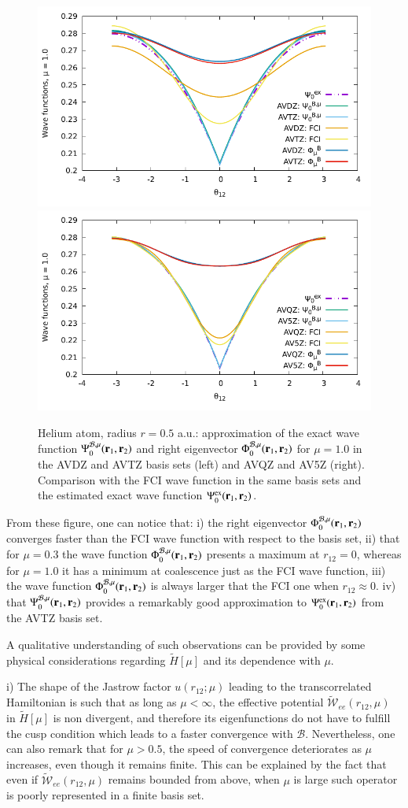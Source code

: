 \documentclass[aip,jcp,reprint,noshowkeys,superscriptaddress]{revtex4-1}
\newcommand{\br}[0]{{\bf {r}}}
\newcommand{\psiex}[0]{\Psi^{\text{ex}}_0}
\newcommand{\phimub}[0]{\Phi^{\mathcal{B},\mu}_0}
\newcommand{\psimub}[0]{\Psi^{\mathcal{B},\mu}_0}
\newcommand{\basis}[0]{\mathcal{B}}
\begin{document}
\begin{figure}
 \label{fig:mu_1.0_dz_3}
        \includegraphics[width=0.45\linewidth]{plots/He/cusp/He_mu_1_0_cusp_avdz_avtz_3.pdf}
        \includegraphics[width=0.45\linewidth]{plots/He/cusp/He_mu_1_0_cusp_avqz_av5z_3.pdf}\\
        \caption{
        Helium atom, radius $r=0.5$ a.u.: approximation of the exact wave function $\psimub(\br{}_1,\br{}_2)$ and right eigenvector $\phimub(\br{}_1,\br{}_2)$ for $\mu=1.0$ in the AVDZ and AVTZ basis sets (left) and AVQZ and AV5Z (right). Comparison with the FCI wave function in the same basis sets and the estimated exact wave function $\psiex(\br{}_1,\br{}_2)$.  }
\end{figure}


From these figure, one can notice that: 
i) the right eigenvector $\phimub(\br{}_1,\br{}_2)$ converges faster than the FCI wave function with respect to the basis set, 
ii) that for $\mu=0.3$ the wave function $\phimub(\br{}_1,\br{}_2)$ presents a maximum at $r_{12}=0$, whereas for $\mu=1.0$ it has a minimum at coalescence just as the FCI wave function, 
iii) the wave function $\phimub(\br{}_1,\br{}_2)$ is always larger that the FCI one when $r_{12}\approx 0$. 
iv) that $\psimub(\br{}_1,\br{}_2)$ provides a remarkably good approximation to $\psiex(\br{}_1,\br{}_2)$ from the AVTZ basis set.

A qualitative understanding of such observations can be provided by some physical considerations regarding $\tilde{H}[\mu]$ and its dependence with $\mu$. 

i) The shape of the Jastrow factor $u(r_{12};\mu)$ leading to the transcorrelated Hamiltonian is such that as long as $\mu < \infty$, the effective potential $\tilde{\mathcal{W}}_{ee}(r_{12},\mu)$ in $\tilde{H}[\mu]$ is non divergent, and therefore its eigenfunctions do not have to fulfill the cusp condition which leads to a faster convergence with $\basis$. 
Nevertheless, one can also remark that for $\mu > 0.5$, the speed of convergence deteriorates as $\mu$ increases, even though it remains finite. This can be explained by the fact that even if $\tilde{\mathcal{W}}_{ee}(r_{12},\mu)$ remains bounded from above, when $\mu$ is large such operator is poorly represented in a finite basis set. 
\end{document}
